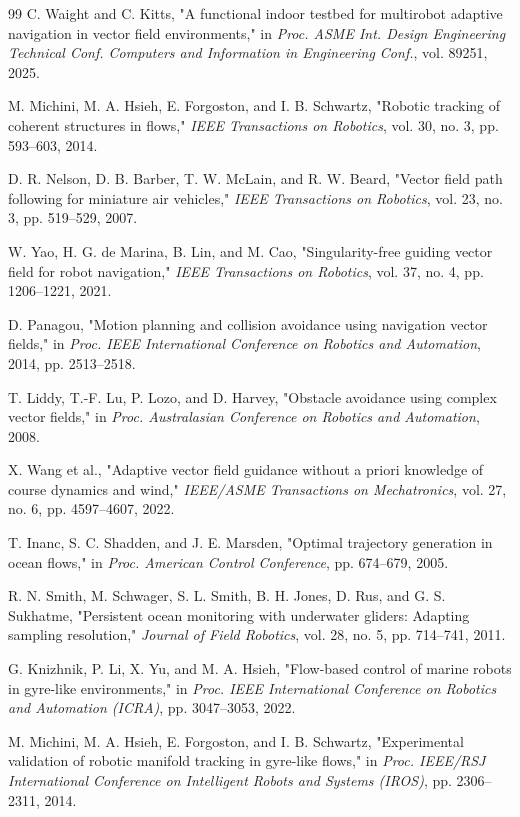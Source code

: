 \documentclass[12pt, letterpaper, oneside]{report}
\begin{document}
\begin{thebibliography}{99}
 C. Waight and C. Kitts, "A functional indoor testbed for multirobot adaptive navigation in vector field environments," in \textit{Proc. ASME Int. Design Engineering Technical Conf. Computers and Information in Engineering Conf.}, vol. 89251, 2025.

 M. Michini, M. A. Hsieh, E. Forgoston, and I. B. Schwartz, "Robotic tracking of coherent structures in flows," \textit{IEEE Transactions on Robotics}, vol. 30, no. 3, pp. 593--603, 2014.

 D. R. Nelson, D. B. Barber, T. W. McLain, and R. W. Beard, "Vector field path following for miniature air vehicles," \textit{IEEE Transactions on Robotics}, vol. 23, no. 3, pp. 519--529, 2007.

 W. Yao, H. G. de Marina, B. Lin, and M. Cao, "Singularity-free guiding vector field for robot navigation," \textit{IEEE Transactions on Robotics}, vol. 37, no. 4, pp. 1206--1221, 2021.

 D. Panagou, "Motion planning and collision avoidance using navigation vector fields," in \textit{Proc. IEEE International Conference on Robotics and Automation}, 2014, pp. 2513--2518.

 T. Liddy, T.-F. Lu, P. Lozo, and D. Harvey, "Obstacle avoidance using complex vector fields," in \textit{Proc. Australasian Conference on Robotics and Automation}, 2008.

 X. Wang et al., "Adaptive vector field guidance without a priori knowledge of course dynamics and wind," \textit{IEEE/ASME Transactions on Mechatronics}, vol. 27, no. 6, pp. 4597--4607, 2022.

 T. Inanc, S. C. Shadden, and J. E. Marsden, "Optimal trajectory generation in ocean flows," in \textit{Proc. American Control Conference}, pp. 674--679, 2005.

 R. N. Smith, M. Schwager, S. L. Smith, B. H. Jones, D. Rus, and G. S. Sukhatme, "Persistent ocean monitoring with underwater gliders: Adapting sampling resolution," \textit{Journal of Field Robotics}, vol. 28, no. 5, pp. 714--741, 2011.

 G. Knizhnik, P. Li, X. Yu, and M. A. Hsieh, "Flow-based control of marine robots in gyre-like environments," in \textit{Proc. IEEE International Conference on Robotics and Automation (ICRA)}, pp. 3047--3053, 2022.

 M. Michini, M. A. Hsieh, E. Forgoston, and I. B. Schwartz, "Experimental validation of robotic manifold tracking in gyre-like flows," in \textit{Proc. IEEE/RSJ International Conference on Intelligent Robots and Systems (IROS)}, pp. 2306--2311, 2014.


\end{thebibliography}
\end{document}
